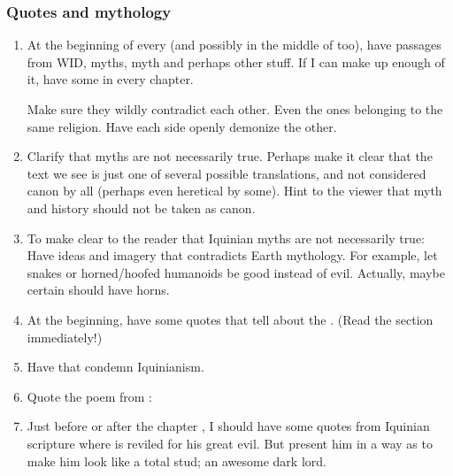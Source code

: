 \subsubsection{Quotes and mythology}
\begin{enumerate}
  \item 
    At the beginning of every  (and possibly in the middle of  too), have passages from WID, \Iquinian myths, \Ortaican myth and perhaps other stuff.
    If I can make up enough of it, have some in every chapter.
    
    Make sure they wildly contradict each other.
    Even the ones belonging to the same religion.
    Have each side openly demonize the other. 
    
  \item 
    Clarify that myths are not necessarily true. 
    Perhaps make it clear that the text we see is just one of several possible translations, and not considered canon by all (perhaps even heretical by some).
    Hint to the viewer that myth and history should not be taken as canon. 

  \item 
    To make clear to the reader that Iquinian myths are not necessarily true: 
    Have ideas and imagery that contradicts Earth mythology. 
    For example, let snakes or horned/hoofed humanoids be good instead of evil. 
    Actually, maybe certain \resphain should have horns. 
    
  \item 
    At the beginning, have some quotes that tell about the . 
    (Read the section immediately!)
    
  \item 
    Have \Ortaican {} that condemn Iquinianism. 
  
  \item 
    Quote the poem  from \cite{KarlEdwardWagner:DarknessWeaves}:
    
  
  \item 
    Just before or after the chapter , I should have some quotes from Iquinian scripture where \Isphet is reviled for his great evil.
    But present him in a way as to make him look like a total stud; an awesome dark lord. 

\end{enumerate}






